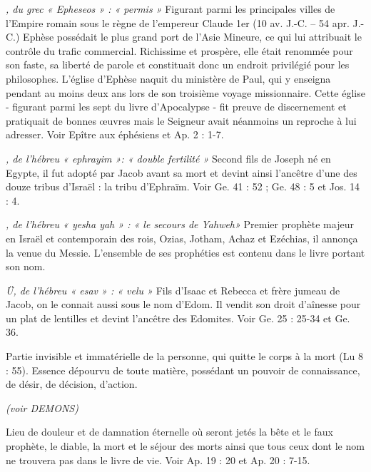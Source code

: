\begin{multicols}{2}
\textit{, du grec « Epheseos » : « permis »}\newline
Figurant parmi les principales villes de l’Empire romain sous le règne de l’empereur Claude 1er (10 av. J.-C. – 54 apr. J.-C.) Ephèse possédait le plus grand port de l’Asie Mineure, ce qui lui attribuait le contrôle du trafic commercial. Richissime et prospère, elle était renommée pour son faste, sa liberté de parole et constituait donc un endroit privilégié pour les philosophes.
L’église d’Ephèse naquit du ministère de Paul, qui y enseigna pendant au moins deux ans lors de son troisième voyage missionnaire. Cette église - figurant parmi les sept du livre d’Apocalypse - fit preuve de discernement et pratiquait de bonnes œuvres mais le Seigneur avait néanmoins un reproche à lui adresser. Voir Epître aux éphésiens et Ap. 2 : 1-7.

\textit{, de l'hébreu « ephrayim »: « double fertilité »}\newline
Second fils de Joseph né en Egypte, il fut adopté par Jacob avant sa mort et devint ainsi l’ancêtre d’une des douze tribus d’Israël : la tribu d'Ephraïm. Voir Ge. 41 : 52 ; Ge. 48 : 5 et Jos. 14 : 4.

\textit{, de l'hébreu « yesha yah » : « le secours de Yahweh»}\newline
Premier prophète majeur en Israël et contemporain des rois, Ozias, Jotham, Achaz et Ezéchias, il annonça la venue du Messie. L’ensemble de ses prophéties est contenu dans le livre portant son nom.

\textit{Ü, de l’hébreu « esav » : « velu »}\newline
Fils d’Isaac et Rebecca et frère jumeau de Jacob, on le connait aussi sous le nom d’Edom. Il vendit son droit d'aînesse pour un plat de lentilles et devint l'ancêtre des Edomites. Voir Ge. 25 : 25-34 et Ge. 36.

\textit{}\newline
Partie invisible et immatérielle de la personne, qui quitte le corps à la mort (Lu 8 : 55). Essence dépourvu de toute matière, possédant un pouvoir de connaissance, de désir, de décision, d'action.

\textit{(voir DEMONS)}\newline

\textit{}\newline
Lieu de douleur et de damnation éternelle où seront jetés la bête et le faux prophète, le diable, la mort et le séjour des morts ainsi que tous ceux dont le nom ne trouvera pas dans le livre de vie. Voir Ap. 19 : 20 et Ap. 20 : 7-15.


\end{multicols}
